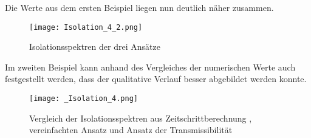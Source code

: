 Die Werte aus dem ersten Beispiel liegen nun deutlich näher zusammen.

\begin{figure}[H]
    \centering
    \texttt{[image: Isolation\_4\_2.png]}
    \caption{Isolationsspektren der drei Ansätze}
    \label{fig:Isolation2}
\end{figure}


Im zweiten Beispiel kann anhand des Vergleiches der numerischen Werte auch festgestellt werden, dass der qualitative Verlauf besser abgebildet werden konnte.

\begin{figure}[H]
    \centering
    \texttt{[image: \_Isolation\_4.png]}
    \caption{Vergleich der Isolationsspektren aus Zeitschrittberechnung \cite{Isemann}, vereinfachten Ansatz und Ansatz der Transmissibilität}
    \label{fig:Isolation2}
\end{figure}

\pagebreak